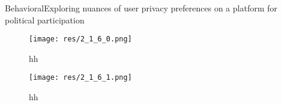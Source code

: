 \begin{frame}{Behavioral}{Exploring nuances of user privacy preferences on a platform for political participation \cite{kaskina_exploring_2017}}
		
				\begin{figure}
					\texttt{[image: res/2\_1\_6\_0.png]}
					\caption{\label{fig:2_1_6_0}hh}

					\texttt{[image: res/2\_1\_6\_1.png]}
					\caption{\label{fig:2_1_6_1}hh}
				\end{figure}
		
\end{frame}


